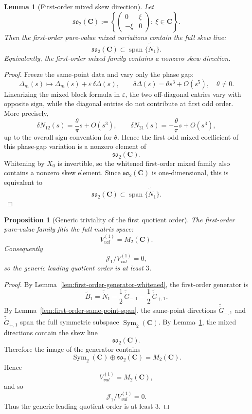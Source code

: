 \documentclass[11pt,a4paper]{amsart}
\def\val{val}%
\theoremstyle{plain}
\newtheorem{proposition}[theorem]{Proposition}
\newtheorem{lemma}[theorem]{Lemma}
\theoremstyle{definition}
\newcommand{\val}{\mathrm{val}}
\begin{document}
\begin{lemma}[First-order mixed skew direction]
\label{lem:first-order-mixed-skew}
Let
\[
\mathfrak{so}_2(\mathbf C)
:=
\left\{
\begin{pmatrix}
0&\xi\\
-\xi&0
\end{pmatrix}
:\ \xi\in\mathbf C
\right\}.
\]
Then the first-order pure-value mixed variations contain the full skew line:
\[
\mathfrak{so}_2(\mathbf C)\subset \operatorname{span}\{\widetilde{\dot N}_1\}.
\]
Equivalently, the first-order mixed family contains a nonzero skew direction.
\end{lemma}

\begin{proof}
Freeze the same-point data and vary only the phase gap:
\[
\Delta_m(s)\mapsto \Delta_m(s)+\varepsilon\,\delta\Delta(s),
\qquad
\delta\Delta(s)=\theta s^3+O(s^5),
\quad \theta\neq 0.
\]
Linearizing the mixed block formula in $\varepsilon$, the two off-diagonal
entries vary with opposite sign, while the diagonal entries do not contribute
at first odd order. More precisely,
\[
\delta N_{12}(s)=\frac{\theta}{\pi}s+O(s^3),
\qquad
\delta N_{21}(s)=-\frac{\theta}{\pi}s+O(s^3),
\]
up to the overall sign convention for $\theta$. Hence the first odd mixed
coefficient of this phase-gap variation is a nonzero element of
\[
\mathfrak{so}_2(\mathbf C).
\]
Whitening by $X_0$ is invertible, so the whitened first-order mixed family
also contains a nonzero skew element. Since $\mathfrak{so}_2(\mathbf C)$ is
one-dimensional, this is equivalent to
\[
\mathfrak{so}_2(\mathbf C)\subset \operatorname{span}\{\widetilde{\dot N}_1\}.
\]
\end{proof}

\begin{proposition}[Generic triviality of the first quotient order]
\label{prop:first-order-quotient-trivial}
The first-order pure-value family fills the full matrix space:
\[
V_{\val}^{(1)}=M_2(\mathbf C).
\]
Consequently
\[
\mathcal J_1/V_{\val}^{(1)}=0,
\]
so the generic leading quotient order is at least $3$.
\end{proposition}

\begin{proof}
By Lemma~\ref{lem:first-order-generator-whitened}, the first-order generator is
\[
\widetilde B_1
=
\widetilde{\dot N}_1
-\frac12\,\widetilde{\dot G}_{-,1}
-\frac12\,\widetilde{\dot G}_{+,1}.
\]
By Lemma~\ref{lem:first-order-same-point-span}, the same-point directions
$\widetilde{\dot G}_{-,1}$ and $\widetilde{\dot G}_{+,1}$ span the full
symmetric subspace $\operatorname{Sym}_2(\mathbf C)$. By
Lemma~\ref{lem:first-order-mixed-skew}, the mixed directions contain the skew
line
\[
\mathfrak{so}_2(\mathbf C).
\]
Therefore the image of the generator contains
\[
\operatorname{Sym}_2(\mathbf C)\oplus \mathfrak{so}_2(\mathbf C)=M_2(\mathbf C).
\]
Hence
\[
V_{\val}^{(1)}=M_2(\mathbf C),
\]
and so
\[
\mathcal J_1/V_{\val}^{(1)}=0.
\]
Thus the generic leading quotient order is at least $3$.
\end{proof}
\end{document}
